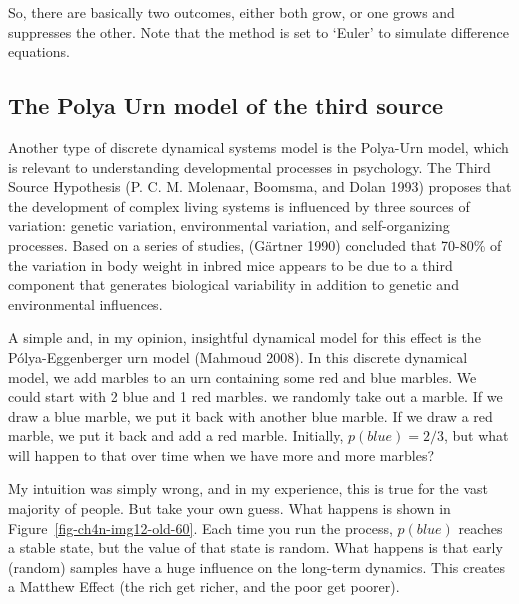 \documentclass[
  a4paper,
  DIV=11,
  numbers=noendperiod,
  oneside]{scrreprt}
\begin{document}
So, there are basically two outcomes, either both grow, or one grows and
suppresses the other. Note that the method is set to `Euler' to simulate
difference equations.

\hypertarget{sec-The-Polya-Urn-model-of-the-third-source}{%
\subsection{The Polya Urn model of the third
source}\label{sec-The-Polya-Urn-model-of-the-third-source}}

Another type of discrete dynamical systems model is the Polya-Urn model,
which is relevant to understanding developmental processes in
psychology. The Third Source Hypothesis (P. C. M. Molenaar, Boomsma, and
Dolan 1993) proposes that the development of complex living systems is
influenced by three sources of variation: genetic variation,
environmental variation, and self-organizing processes. Based on a
series of studies, (Gärtner 1990) concluded that 70-80\% of the
variation in body weight in inbred mice appears to be due to a third
component that generates biological variability in addition to genetic
and environmental influences.

A simple and, in my opinion, insightful dynamical model for this effect
is the Pólya-Eggenberger urn model (Mahmoud 2008). In this discrete
dynamical model, we add marbles to an urn containing some red and blue
marbles. We could start with 2 blue and 1 red marbles. we randomly take
out a marble. If we draw a blue marble, we put it back with another blue
marble. If we draw a red marble, we put it back and add a red marble.
Initially, \(p(blue) = 2/3\), but what will happen to that over time
when we have more and more marbles?

My intuition was simply wrong, and in my experience, this is true for
the vast majority of people. But take your own guess. What happens is
shown in Figure~\ref{fig-ch4n-img12-old-60}. Each time you run the
process, \(p(blue)\) reaches a stable state, but the value of that state
is random. What happens is that early (random) samples have a huge
influence on the long-term dynamics. This creates a Matthew Effect (the
rich get richer, and the poor get poorer).
\end{document}
